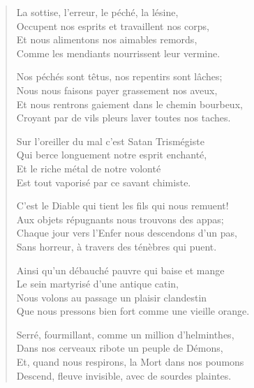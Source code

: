 \documentclass[12pt]{article}
\begin{document}
\begin{singlespacing}
\begin{verse}
La sottise, l'erreur, le p\'ech\'e, la l\'esine,\\
Occupent nos esprits et travaillent nos corps,\\
Et nous alimentons nos aimables remords,\\
Comme les mendiants nourrissent leur vermine.
\vspace{\baselineskip}

Nos p\'ech\'es sont t\^etus, nos repentirs sont l\^aches;\\
Nous nous faisons payer grassement nos aveux,\\
Et nous rentrons gaiement dans le chemin bourbeux,\\
Croyant par de vils pleurs laver toutes nos taches.
\vspace{\baselineskip}

Sur l'oreiller du mal c'est Satan Trism\'egiste\\
Qui berce longuement notre esprit enchant\'e,\\
Et le riche m\'etal de notre volont\'e\\
Est tout vaporis\'e par ce savant chimiste.
\vspace{\baselineskip}

C'est le Diable qui tient les fils qui nous remuent!\\
Aux objets r\'epugnants nous trouvons des appas;\\
Chaque jour vers l'Enfer nous descendons d'un pas,\\
Sans horreur, \`a travers des t\'en\`ebres qui puent.
\vspace{\baselineskip}

Ainsi qu'un d\'ebauch\'e pauvre qui baise et mange\\
Le sein martyris\'e d'une antique catin,\\
Nous volons au passage un plaisir clandestin\\
Que nous pressons bien fort comme une vieille orange.
\vspace{\baselineskip}

Serr\'e, fourmillant, comme un million d'helminthes,\\
Dans nos cerveaux ribote un peuple de D\'emons,\\
Et, quand nous respirons, la Mort dans nos poumons\\
Descend, fleuve invisible, avec de sourdes plaintes.
\vspace{\baselineskip}


\end{verse}
\end{singlespacing}
\end{document}
